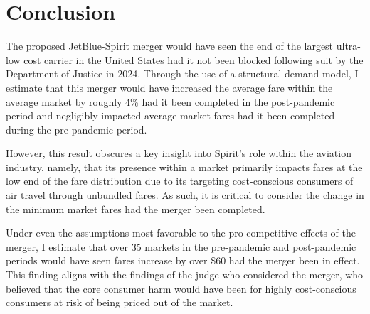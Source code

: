 \documentclass{article}
\begin{document}

    
  

    
	\section{Conclusion}
	\label{sec:Conclusion}
    The proposed JetBlue-Spirit merger would have seen the end of the largest ultra-low cost carrier in the United States had it not been blocked following suit by the Department of Justice in 2024. Through the use of a structural demand model, I estimate that this merger would have increased the average fare within the average market by roughly 4\% had it been completed in the post-pandemic period and negligibly impacted average market fares had it been completed during the pre-pandemic period.

    However, this result obscures a key insight into Spirit's role within the aviation industry, namely, that its presence within a market primarily impacts fares at the low end of the fare distribution due to its targeting cost-conscious consumers of air travel through unbundled fares. As such, it is critical to consider the change in the minimum market fares had the merger been completed. 

    Under even the assumptions most favorable to the pro-competitive effects of the merger, I estimate that over 35 markets in the pre-pandemic and post-pandemic periods would have seen fares increase by over \$60 had the merger been in effect. This finding aligns with the findings of the judge who considered the merger, who believed that the core consumer harm would have been for highly cost-conscious consumers at risk of being priced out of the market.
\end{document}
